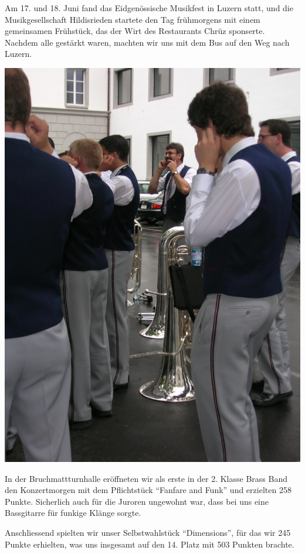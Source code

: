 \begin{history}

    Am 17. und 18. Juni fand das Eidgenössische Musikfest in Luzern statt, und
    die Musikgesellschaft Hildisrieden startete den Tag frühmorgens mit einem
    gemeinsamen Frühstück, das der Wirt des Restaurants Chrüz sponserte. Nachdem
    alle gestärkt waren, machten wir uns mit dem Bus auf den Weg nach Luzern.

    \begin{MulticolFigure}
        \centering
        \includegraphics[width=0.7\linewidth]{./chap/2001-2024/2006/Mentale-Einstimmung.jpg}
    \end{MulticolFigure}

    In der Bruchmattturnhalle eröffneten wir als erste in der 2. Klasse Brass
    Band den Konzertmorgen mit dem Pflichtstück \enquote{Fanfare and Funk} und
    erzielten 258 Punkte. Sicherlich auch für die Juroren ungewohnt war, dass
    bei uns eine Bassgitarre für funkige Klänge sorgte.

    Anschliessend spielten wir unser Selbstwahlstück \enquote{Dimensions}, für
    das wir 245 Punkte erhielten, was uns insgesamt auf den 14. Platz mit 503
    Punkten brachte.


\end{history}
